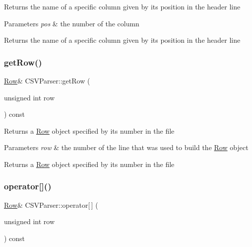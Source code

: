Returns the name of a specific column given by its position in the header line 
\begin{DoxyParams}{Parameters}
{\em pos} & the number of the column \\
\hline
\end{DoxyParams}
\begin{DoxyReturn}{Returns}
the name of a specific column given by its position in the header line 
\end{DoxyReturn}
\mbox{\label{class_c_s_v_parser_a93789f318f0abd972860c507b89d4587}} 
\subsubsection{\texorpdfstring{get\+Row()}{getRow()}}
{\footnotesize\ttfamily \hyperlink{class_row}{Row}\& C\+S\+V\+Parser\+::get\+Row (\begin{DoxyParamCaption}\item[{unsigned int}]{row }\end{DoxyParamCaption}) const}

Returns a \hyperlink{class_row}{Row} object specified by its number in the file 
\begin{DoxyParams}{Parameters}
{\em row} & the number of the line that was used to build the \hyperlink{class_row}{Row} object \\
\hline
\end{DoxyParams}
\begin{DoxyReturn}{Returns}
a \hyperlink{class_row}{Row} object specified by its number in the file 
\end{DoxyReturn}
\mbox{\label{class_c_s_v_parser_a7d3d0c3f994b825aaba25625f0b01612}} 
\subsubsection{\texorpdfstring{operator[]()}{operator[]()}}
{\footnotesize\ttfamily \hyperlink{class_row}{Row}\& C\+S\+V\+Parser\+::operator\mbox{[}$\,$\mbox{]} (\begin{DoxyParamCaption}\item[{unsigned int}]{row }\end{DoxyParamCaption}) const}

